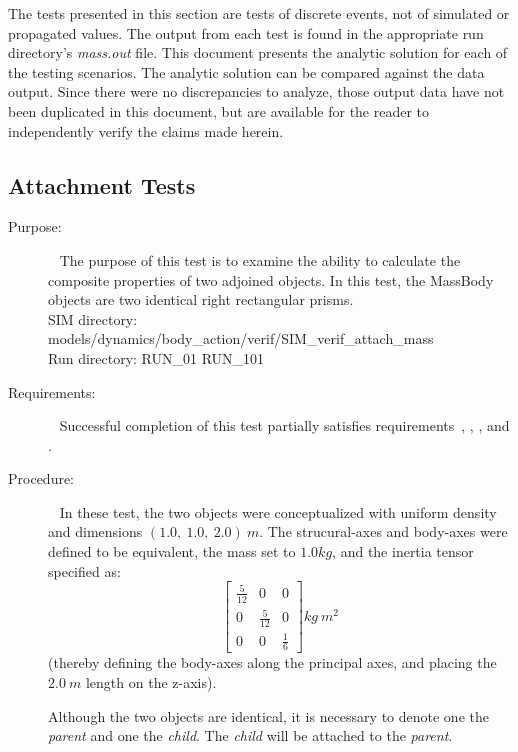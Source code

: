 The tests presented in this section are tests of discrete events, not of 
simulated or propagated values.  The output from each test is found in the 
appropriate run directory's \textit{mass.out} file.  
This document presents the analytic solution for each of the testing 
scenarios.  The analytic solution can be compared against the data output. 
Since there were no 
discrepancies to analyze, those output data have not been duplicated in this 
document, but are available for the reader to independently verify the claims 
made herein.

\subsection{Attachment Tests}
\label{test:mass_01}
\begin{description}
\item[Purpose:] \ \newline
The purpose of this test is to examine the ability to calculate the composite 
properties of two adjoined objects.
In this test, the MassBody objects are two identical
right rectangular prisms.\\
SIM directory: models/dynamics/body\_action/verif/SIM\_verif\_attach\_mass\\
Run directory: RUN\_01 RUN\_101
\item[Requirements:] \ \newline
Successful completion of this test partially satisfies
requirements~, , 
, and .
\item[Procedure:]\ \newline
In these test, the two objects were conceptualized with uniform density and 
dimensions $(1.0, ~1.0, ~2.0) ~m$.  The strucural-axes and body-axes were 
defined to be equivalent, the mass set to $1.0 kg$, and the inertia tensor 
specified 
as:
\begin{equation*}
\begin{bmatrix} \frac{5}{12} & 0 & 0 \\ 0 & \frac{5}{12} & 0 \\ 0 & 0 & 
\frac{1}{6} \end{bmatrix} kg ~ m^2 
\end{equation*}
(thereby defining the body-axes along the principal axes, and placing the $2.0 
~m$ length on the z-axis).

Although the two objects are identical, it is necessary to denote one the 
\textit{parent} and one the \textit{child}.  The \textit{child} will be 
attached to the \textit{parent}.


\end{description}

